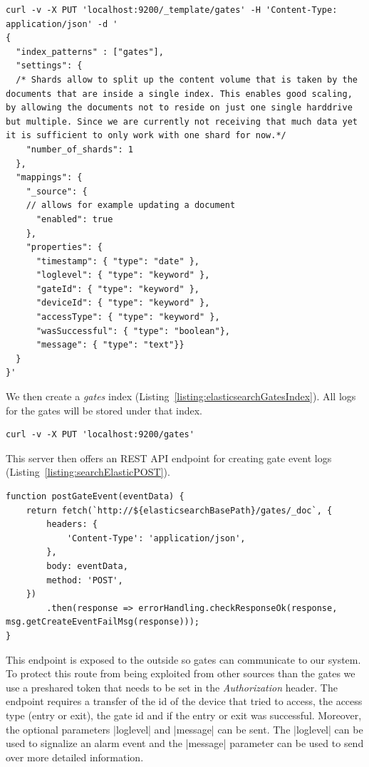 \clearpage

\begin{lstlisting}[label={listing:curlScriptTemplateElastic},caption={cURL script for creating gates index template}]
curl -v -X PUT 'localhost:9200/_template/gates' -H 'Content-Type: application/json' -d '
{
  "index_patterns" : ["gates"],
  "settings": {
  /* Shards allow to split up the content volume that is taken by the documents that are inside a single index. This enables good scaling, by allowing the documents not to reside on just one single harddrive but multiple. Since we are currently not receiving that much data yet it is sufficient to only work with one shard for now.*/
    "number_of_shards": 1
  },
  "mappings": {
    "_source": {
    // allows for example updating a document
      "enabled": true
    },
    "properties": {
      "timestamp": { "type": "date" },
      "loglevel": { "type": "keyword" },
      "gateId": { "type": "keyword" },
      "deviceId": { "type": "keyword" },
      "accessType": { "type": "keyword" },
      "wasSuccessful": { "type": "boolean"},
      "message": { "type": "text"}}
  }
}'
\end{lstlisting}

We then create a \emph{gates} index (Listing~\ref{listing:elasticsearchGatesIndex}). All logs for the gates will be stored under that index.

\begin{lstlisting}[label={listing:elasticsearchGatesIndex},caption={cURL script for creating gates index}]
curl -v -X PUT 'localhost:9200/gates'
\end{lstlisting}

This server then offers an REST API endpoint for creating gate event logs (Listing~\ref{listing:searchElasticPOST}).

 \clearpage
 
\begin{lstlisting}[label={listing:searchElasticPOST},caption={Interface of Elasticsearch server to create gate event logs}]
function postGateEvent(eventData) {
    return fetch(`http://${elasticsearchBasePath}/gates/_doc`, {
        headers: {
            'Content-Type': 'application/json',
        },
        body: eventData,
        method: 'POST',
    })
        .then(response => errorHandling.checkResponseOk(response, msg.getCreateEventFailMsg(response)));
}
\end{lstlisting}

This endpoint is exposed to the outside so gates can communicate to our system. To protect this route from being exploited from other sources than the gates we use a preshared token that needs to be set in the \emph{Authorization} header.
 The endpoint requires a transfer of the id of the device that tried to access, the access type (entry or exit), the gate id and if the entry or exit was successful. Moreover, the optional parameters |loglevel| and |message| can be sent. The |loglevel| can be used to signalize an alarm event and the |message| parameter can be used to send over more detailed information.

